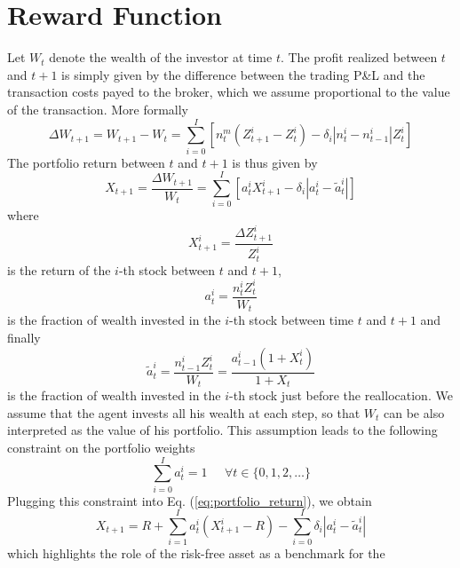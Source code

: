 \section{Reward Function}
Let $W_t$ denote the wealth of the investor at time $t$. The profit realized
between $t$ and $t+1$ is simply given by the difference between the trading
P\&L and the transaction costs payed to the broker, which we assume
proportional to the value of the transaction. More formally
\begin{equation*}
	\Delta W_{t+1} = W_{t+1} - W_t = \sum^{I}_{i=0} \left[n_t^m (Z_{t+1}^i -
	Z_t^i) - \delta_i \left| n_t^i - n_{t-1}^i \right| Z_t^i \right] 
\end{equation*}
The portfolio return between $t$ and $t+1$ is thus given by
\begin{equation}\label{eq:portfolio_return}
	X_{t+1} = \frac{\Delta W_{t+1}}{W_t} = \sum^{I}_{i=0} \left[ a_t^i
	X_{t+1}^i - \delta_i \left| a_t^i - \tilde{a}_t^i \right| \right]  
\end{equation}
where 
\begin{equation*}
	X_{t+1}^i = \frac{\Delta Z_{t+1}^i}{Z_t^i}
\end{equation*}
is the return of the $i$-th stock between $t$ and $t+1$, 
\begin{equation*}
	a_t^i = \frac{n_t^i Z_t^i}{W_t}
\end{equation*}
is the fraction of wealth invested in the $i$-th stock between time $t$ and
$t+1$ and finally 
\begin{equation*}
	\tilde{a}_t^i = \frac{n_{t-1}^i Z_t^i}{W_t} = \frac{a_{t-1}^i (1+X_t^i)}
	{1 + X_t}
\end{equation*}
is the fraction of wealth invested in the $i$-th stock just before the 
reallocation. We assume that the agent invests all his wealth at each step, so 
that $W_t$ can be also interpreted as the value of his portfolio. This 
assumption leads to the following constraint on the portfolio weights
\begin{equation}
	\sum^{I}_{i=0} a_t^i = 1 \;\;\;\;\; \forall t \in \{0, 1, 2, \ldots\}
\end{equation}
Plugging this constraint into Eq. (\ref{eq:portfolio_return}), we obtain
\begin{equation}\label{eq:portfolio_return_benchmark}
	X_{t+1} = R + \sum^{I}_{i=1} a_t^i (X_{t+1}^i - R) - \sum^{I}_{i=0}
	\delta_i \left| a_t^i - \tilde{a}_t^i \right|  
\end{equation}
which highlights the role of the risk-free asset as a benchmark for the 
